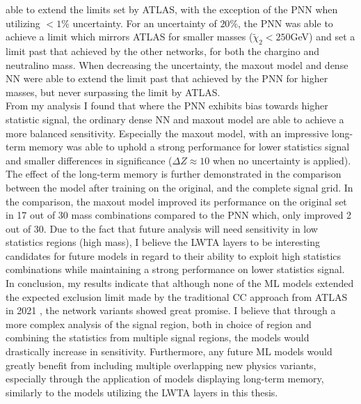 able to extend the limits set by \ac{ATLAS}, with the exception of the \ac{PNN} when utilizing $<1\%$ uncertainty. For an uncertainty of $20\%$, the \ac{PNN} was able to achieve a limit which mirrors \ac{ATLAS} for smaller masses ($\tilde{\chi}_2<250$GeV)
and set a limit past that achieved by the other networks, for both the chargino and neutralino mass. When decreasing the uncertainty, the maxout model and dense \ac{NN} were able to extend the limit past that achieved by the \ac{PNN} for higher masses, 
but never surpassing the limit by \ac{ATLAS}.
\\\newline
From my analysis I found that where the \ac{PNN} exhibits bias towards higher statistic signal, the ordinary dense \ac{NN} and maxout model are able to achieve a more balanced sensitivity. Especially the 
maxout model, with an impressive long-term memory was able to uphold a strong performance for lower statistics signal and smaller differences in significance ($\Delta Z \approx 10$ when no uncertainty is applied). The effect of the long-term memory 
is further demonstrated in the comparison between the model after training on the original, and the complete signal grid. In the comparison, the maxout model improved its performance on the original set in 17 out of 30 mass combinations compared to the \ac{PNN} which, only improved
2 out of 30. Due to the fact that future analysis will need sensitivity in low statistics regions (high mass), I believe the \ac{LWTA} layers to be interesting candidates for future models in regard to their ability to exploit high statistics combinations while maintaining a 
strong performance on lower statistics signal. 
\\\newline
In conclusion, my results indicate that although none of the \ac{ML} models extended the expected exclusion limit made by the traditional \ac{CC} approach from \ac{ATLAS} in 2021 \cite{atlas_search_2021}, the network variants showed great promise. I believe
that through a more complex analysis of the signal region, both in choice of region and combining the statistics from multiple signal regions, the models would drastically increase in sensitivity. Furthermore, any future \ac{ML} models would greatly benefit from
including multiple overlapping new physics variants, especially through the application of models displaying long-term memory, similarly to the models utilizing the \ac{LWTA} layers in this thesis.
